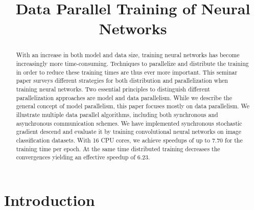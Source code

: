 \documentclass[conference]{IEEEtran}
\begin{document}
\title{Data Parallel Training of Neural Networks}


\author{
}


\maketitle

\begin{abstract}
With an increase in both model and data size, training neural networks has become increasingly more time-consuming.
Techniques to parallelize and distribute the training in order to reduce these training times are thus ever more important.
This seminar paper surveys different strategies for both distribution and parallelization when training neural networks.
Two essential principles to distinguish different parallelization approaches are model and data parallelism.
While we describe the general concept of model parallelism, this paper focuses mostly on data parallelism.
We illustrate multiple data parallel algorithms, including both synchronous and asynchronous communication schemes.
%
We have implemented synchronous stochastic gradient descend and evaluate it by training convolutional neural networks on image classification datasets.
With 16 CPU cores, we achieve speedups of up to 7.70 for the training time per epoch.
At the same time distributed training decreases the convergences yielding an effective speedup of 6.23.

\end{abstract}

\section{Introduction} %
\label{sec:introduction}
%
%
\end{document}
